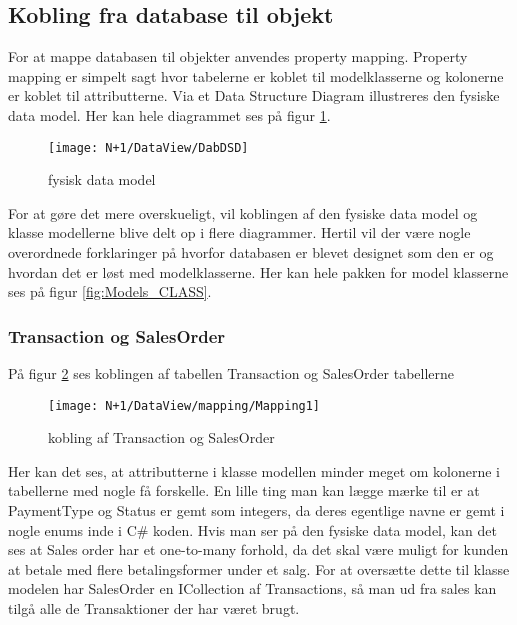 \subsection{Kobling fra database til objekt}
For at mappe databasen til objekter anvendes property mapping. Property mapping er simpelt sagt hvor tabelerne er koblet til modelklasserne og kolonerne er koblet til attributterne. Via et Data Structure Diagram illustreres den fysiske data model. Her kan hele diagrammet ses på figur \ref{fig:DSD}.

\begin{figure}[H]
    \centering
    \texttt{[image: N+1/DataView/DabDSD]}
    \caption{fysisk data model}
    \label{fig:DSD}
\end{figure}

For at gøre det mere overskueligt, vil koblingen af den fysiske data model og klasse modellerne blive delt op i flere diagrammer. Hertil vil der være nogle overordnede forklaringer på hvorfor databasen er blevet designet som den er og hvordan det er løst med modelklasserne. Her kan hele pakken for model klasserne ses på figur \ref{fig:Models_CLASS}.

\subsubsection{Transaction og SalesOrder}
På figur \ref{fig:Mapping_TS} ses koblingen af tabellen Transaction og SalesOrder tabellerne

\begin{figure}[H]
    \centering
    \texttt{[image: N+1/DataView/mapping/Mapping1]}
    \caption{kobling af Transaction og SalesOrder}
    \label{fig:Mapping_TS}
\end{figure}

Her kan det ses, at attributterne i klasse modellen minder meget om kolonerne i tabellerne med nogle få forskelle. En lille ting man kan lægge mærke til er at PaymentType og Status er gemt som integers, da deres egentlige navne er gemt i nogle enums inde i C\# koden. 
\newline\newline
Hvis man ser på den fysiske data model, kan det ses at Sales order har et one-to-many forhold, da det skal være muligt for kunden at betale med flere betalingsformer under et salg. For at oversætte dette til klasse modelen har SalesOrder en ICollection af Transactions, så man ud fra sales kan tilgå alle de Transaktioner der har været brugt. 

